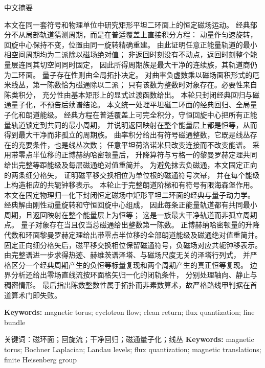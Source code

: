 \documentclass[10pt]{article}
\begin{document}
\begin{center}{\cjkfont 中文摘要}\end{center}
{\cjkfont\small\raggedright
\ifcase\CRevisionRound
本文在同一套符号和物理单位中研究矩形平坦二环面上的恒定磁场运动。
经典部分不从局部轨道猜测周期，而是在普适覆盖上直接积分方程：
动量作匀速旋转，回旋中心保持不变，位置由同一旋转精确重建。
由此证明任意正能量轨道的最小相空间周期均为二派除以磁场绝对值；
非返回时刻没有不动点，返回时刻整个能量层连同其切空间同时固定，
因此所得周期族是最大干净的连续族，其轨道商仍为二环面。
量子存在性则由全局拓扑决定。
对曲率负虚数乘以磁场面积形式的厄米线丛，第一陈数恰为磁通除以二派；
只有该数为整数时对象存在。必要性来自陈类积分，
充分性由基本矩形上的显式过渡函数给出。
本轮只封闭经典回归与磁通量子化，不预告后续谱结论。
\or
本文统一处理平坦磁二环面的经典回归、全局量子化和朗道能级。
经典方程在普适覆盖上可完全积分，守恒回旋中心把所有正能量轨道锁定到共同的最小周期，
并说明返回映射在整个能量层上都是恒等，从而得到最大干净而非孤立的周期族。
曲率积分给出有符号磁通整数，它既是线丛存在的充要条件，也是线丛次数；
任意平坦荷洛诺米只改变连接而不改变能谱。
采用带零点半位移的正博赫纳哈密顿量后，
升降算符与亏格一的黎曼罗赫定理共同给出完整等距能级及每层磁通绝对值重简并。
为避免抹去负磁通，本文固定正向的两条细分格矢，
证明磁平移交换相位为单位根的磁通符号次幂，
并在每个能级上构造相应的共轭钟移表示。
本轮止于完整朗道阶梯和有符号有限海森堡作用。
\else
本文在固定物理归一化下封闭恒定磁场中矩形平坦二环面的经典与量子动力学。
经典解由刚性动量旋转和守恒回旋中心组成，
因此每条正能量轨道都有共同最小周期，且返回映射在整个能量层上为恒等；
这是一族最大干净轨道而非孤立周期点。
量子对象存在当且仅当总磁通给出整数第一陈数。
正博赫纳哈密顿量的升降代数和环面黎曼罗赫定理给出带零点半位移的全部朗道能级及磁通绝对值重简并。
固定正向细分格矢后，磁平移交换相位保留磁通符号，负磁场对应共轭钟移表示。
由完整谱进一步求得热迹、赫维茨谱泽塔、与磁场尺度无关的泽塔行列式，
并严格区分一个经典周期产生的负恒等标量复现和两个周期产生的真正恒等复现。
边界分析还给出零场直线流按环面格矢归一化的闭轨条件，
分别处理轴向、静止与稠密情形。
最后指出陈数整数性属于拓扑而非素数算术，故严格路线甲判据在首道算术门即失败。
\fi
\par}

\medskip
\ifcase\CRevisionRound
\noindent\textbf{Keywords:} magnetic torus; cyclotron flow; clean return; flux quantization; line bundle

{\cjkfont\noindent 关键词：磁环面；回旋流；干净回归；磁通量子化；线丛}
\or
\noindent\textbf{Keywords:} magnetic torus; Bochner Laplacian; Landau levels; flux quantization; magnetic translations; finite Heisenberg group
\end{document}
